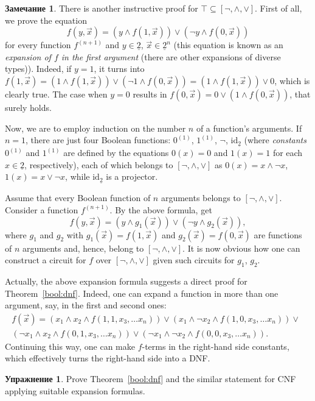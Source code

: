 \documentclass[12pt,notitlepage]{article}
\theoremstyle{plain}
\theoremstyle{definition}
\newtheorem{exc}[thm]{Упражнение}
\newtheorem{rem}[thm]{Замечание}
\theoremstyle{plain}
\newcommand{\sbs}{\subseteq}
\newcommand{\id}{\mathrm{id}}
\newcommand{\ul}[1]{\underline{#1}}
\newcommand{\1}{\mathbf{1}}
\newcommand{\0}{\mathbf{0}}
\begin{document}
\begin{rem}\label{bool:func_var}
	There is another instructive proof for $\top \sbs [{\neg}, {\wedge}, {\vee}]$. First of all, we prove the equation
	$$f(y, \vec x) = (y \wedge f(1, \vec x)) \vee (\neg y \wedge f(0, \vec x))$$
	for every function $f^{(n+1)}$ and $y \in \ul{2}$, $\vec{x} \in \ul{2}^{n}$ (this equation is known as an \emph{expansion of $f$ in the first argument} (there are other expansions of diverse types)). Indeed, if $y = 1$, it turns into $f(1, \vec x) = (1 \wedge f(1, \vec x)) \vee (\neg 1 \wedge f(0, \vec x)) = (1 \wedge f(1, \vec x)) \vee 0$, which is clearly true. The case when $y = 0$ results in $f(0, \vec x) = 0 \vee (1 \wedge f(0, \vec x))$, that surely holds.
	
	Now, we are to employ induction on the number $n$ of a function's arguments. If $n = 1$, there are just four Boolean functions: $0^{(1)}$, $1^{(1)}$, $\neg$, $\id_{\ul{2}}$ (where \emph{constants} $0^{(1)}$ and $1^{(1)}$ are defined by the equations $0(x) = 0$ and $1(x) = 1$ for each $x \in \ul{2}$, respectively), each of which belongs to $[{\neg}, {\wedge}, {\vee}]$ as $0(x) = x \wedge \neg x$, $1(x) = x \vee \neg x$, while $\id_{\ul{2}}$ is a projector.
	
	Assume that every Boolean function of $n$ arguments belongs to $[{\neg}, {\wedge}, {\vee}]$. Consider a function $f^{(n+1)}$. By the above formula, get
	$$f(y, \vec x) = (y \wedge g_1(\vec x)) \vee (\neg y \wedge g_2(\vec x)),$$
	where $g_1$ and $g_2$ with $g_1(\vec x) = f(1, \vec x)$ and $g_2(\vec x) = f(0, \vec x)$ are functions of $n$ arguments and, hence, belong to $[{\neg}, {\wedge}, {\vee}]$. It is now obvious how one can construct a circuit for $f$ over $[{\neg}, {\wedge}, {\vee}]$ given such circuits for $g_1$, $g_2$.
	
	Actually, the above  expansion formula suggests a direct proof for Theorem~\ref{bool:dnf}. Indeed, one can expand a function in more than one argument, say, in the first and second ones:
	\begin{multline*}
		f(\vec x) = (x_1 \wedge x_2 \wedge f(1, 1, x_3, \ldots x_n)) \vee (x_1 \wedge \neg x_2 \wedge f(1, 0, x_3, \ldots x_n)) \vee\phantom{y}\\
		(\neg x_1 \wedge x_2 \wedge f(0, 1, x_3, \ldots x_n)) \vee (\neg x_1 \wedge \neg x_2 \wedge f(0, 0, x_3, \ldots x_n)).
	\end{multline*}
	Continuing this way, one can make $f$-terms in the right-hand side constants, which effectively turns the right-hand side into a DNF.
\end{rem}
\begin{exc}
	Prove Theorem~\ref{bool:dnf} and the similar statement for CNF applying suitable expansion formulas.
\end{exc}
\end{document}
